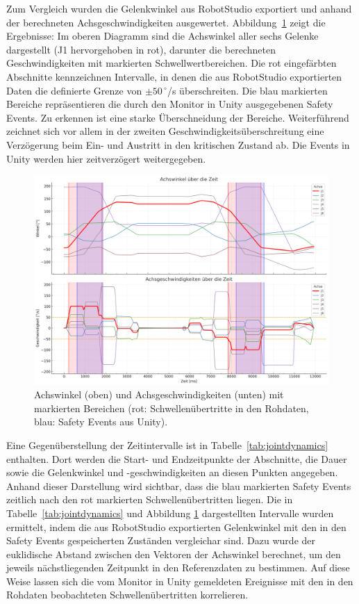 Zum Vergleich wurden die Gelenkwinkel aus RobotStudio exportiert und anhand der berechneten
Achsgeschwindigkeiten ausgewertet. Abbildung~\ref{fig:jointdynamics} zeigt die Ergebnisse:
Im oberen Diagramm sind die Achswinkel aller sechs Gelenke dargestellt (J1 hervorgehoben in rot),
darunter die berechneten Geschwindigkeiten mit markierten Schwellwertbereichen.
Die rot eingefärbten Abschnitte kennzeichnen Intervalle, in denen die aus RobotStudio
exportierten Daten die definierte Grenze von $\pm 50\,^\circ$/s überschreiten.
Die blau markierten Bereiche repräsentieren die durch den Monitor in Unity ausgegebenen
Safety Events.
Zu erkennen ist eine starke Überschneidung der Bereiche.
Weiterführend zeichnet sich vor allem in der zweiten
Geschwindigkeitsüberschreitung eine Verzögerung beim Ein- und Austritt in den
kritischen Zustand ab. Die Events in Unity werden hier zeitverzögert
weitergegeben.

\begin{figure}[H]
	\centering
	\includegraphics[width=\textwidth]{Figures/achsgeschwindigkeitPlot.png}
	\caption{Achswinkel (oben) und Achsgeschwindigkeiten (unten) mit markierten
		Bereichen (rot: Schwellenübertritte in den Rohdaten, blau: Safety Events aus Unity).}
	\label{fig:jointdynamics}
\end{figure}

Eine Gegenüberstellung der Zeitintervalle ist in Tabelle~\ref{tab:jointdynamics} enthalten.
Dort werden die Start- und Endzeitpunkte der Abschnitte, die Dauer sowie die Gelenkwinkel
und -geschwindigkeiten an diesen Punkten angegeben. Anhand dieser Darstellung wird sichtbar,
dass die blau markierten Safety Events zeitlich nach den rot markierten Schwellenübertritten
liegen. Die in Tabelle~\ref{tab:jointdynamics} und Abbildung \ref{fig:jointdynamics} dargestellten Intervalle wurden ermittelt,
indem die aus RobotStudio exportierten Gelenkwinkel mit den in den Safety Events
gespeicherten Zuständen vergleichar sind. Dazu wurde der euklidische Abstand zwischen
den Vektoren der Achswinkel berechnet, um den jeweils nächstliegenden Zeitpunkt in
den Referenzdaten zu bestimmen. Auf diese Weise lassen sich die vom Monitor in Unity
gemeldeten Ereignisse mit den in den Rohdaten beobachteten Schwellenübertritten
korrelieren.

